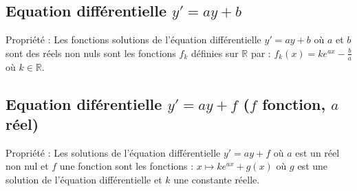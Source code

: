 \documentclass[11pt,a4paper]{article}
\begin{document}
\subsection{Equation différentielle $y' = ay + b$}

\begin{boiteProp}{Propriété :}
    Les fonctions solutions de l'équation différentielle $y' = ay + b$ où $a$ et $b$ sont des réels non nuls sont les fonctions $f_k$ définies sur $\mathbb{R}$ par : $f_k(x) = k e^{ax} - \frac{b}{a}$ où $k \in \mathbb{R}$.
\end{boiteProp}

\subsection{Equation diférentielle $y' = ay + f$ ($f$ fonction, $a$ réel)}

\begin{boiteProp}{Propriété :}
    Les solutions de l'équation différentielle $y' = ay + f$ où $a$ est un réel non nul et $f$ une fonction sont les fonctions : $x \mapsto k e^{ax} + g(x)$
    \newline
    où $g$ est une solution de l'équation différentielle et $k$ une constante réelle.
\end{boiteProp}
\end{document}
